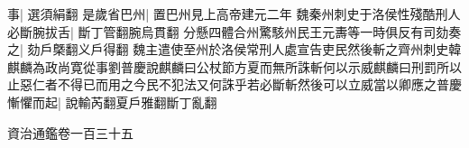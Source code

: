 事|{
	選須絹翻}
是歲省巴州|{
	置巴州見上高帝建元二年}
魏秦州刺史于洛侯性殘酷刑人必斷腕拔舌|{
	斷丁管翻腕烏貫翻}
分懸四體合州驚駭州民王元夀等一時俱反有司劾奏之|{
	劾戶槩翻义戶得翻}
魏主遣使至州於洛侯常刑人處宣告吏民然後斬之齊州刺史韓麒麟為政尚寛從事劉普慶說麒麟曰公杖節方夏而無所誅斬何以示威麒麟曰刑罰所以止惡仁者不得已而用之今民不犯法又何誅乎若必斷斬然後可以立威當以卿應之普慶慚懼而起|{
	說輸芮翻夏戶雅翻斷丁亂翻}


資治通鑑卷一百三十五














































































































































